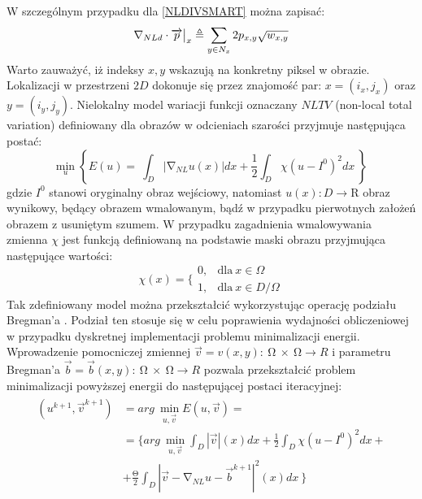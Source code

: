 \documentclass[12pt, twoside, openany]{report}
\theoremstyle{definition}
\begin{document}
W szczególnym przypadku dla \eqref{NLDIVSMART} można zapisać:
\begin{equation}
{\mathrm{\nabla }}_{NLd}\cdot \overrightarrow{p}\big|_x \triangleq \sum_{ 
y\in N_x \\ 
}{2p_{x,y}}\sqrt{w_{x,y}}
\label{DNLDIVSMART}
\end{equation}
Warto zauważyć, iż indeksy $x,y$ wskazują na konkretny piksel w obrazie. Lokalizacji w przestrzeni $2D$ dokonuje się przez znajomość par: $x=(i_x,j_x)$ oraz $y=(i_y,j_y)$.
Nielokalny model wariacji funkcji oznaczany $NLTV$ (non-local total variation) definiowany dla obrazów w odcieniach szarości przyjmuje następująca postać:
\begin{equation}
{\mathop{\mathrm{min}}_{u} \left\{E\left(u\right)=\ \int_D{\left|{\mathrm{\nabla }}_{NL}u(x)\right|}dx+\frac{1}{2}\int_D{\chi{\left(u-I^0\right)}^2}dx\ \right\}\ }
\label{NLTVGRAY}
\end{equation}
gdzie $I^0$ stanowi oryginalny obraz wejściowy, natomiast $u\left(x\right):D\mathrm{\longrightarrow }\mathrm{R}$ obraz wynikowy, będący obrazem wmalowanym, bądź w przypadku pierwotnych założeń obrazem z usuniętym szumem. W przypadku zagadnienia wmalowywania zmienna ${\chi }$ jest funkcją definiowaną na podstawie maski obrazu przyjmująca następujące wartości:
\begin{equation}
\chi \left(x\right)=\Bigg\{ \begin{array}{ll}
0, & \text{dla} \ x \in \Omega \\ 
1, & \text{dla} \ x \in D/ \Omega \end{array}
\label{maskFunction}
\end{equation}
Tak zdefiniowany model można przekształcić wykorzystując operację podziału Bregman’a \cite{bresson2009short}. Podział ten stosuje się w celu poprawienia wydajności obliczeniowej w przypadku dyskretnej implementacji problemu minimalizacji energii. Wprowadzenie pomocniczej zmiennej $\overrightarrow{v}=v\left(x,y\right):\ \mathrm{\Omega }\mathrm{\ } \times \ \mathrm{\Omega }\longrightarrow R$ i parametru Bregman’a $\overrightarrow{b}=\overrightarrow{b}\left(x,y\right):\ \mathrm{\Omega }\mathrm{\ }\times \ \mathrm{\Omega }\longrightarrow R$ pozwala przekształcić problem minimalizacji powyższej energii do następującej postaci iteracyjnej:
\begin{align}
\begin{aligned}
\left(u^{k+1},{\overrightarrow{v}}^{k+1}\right) &= arg\ \mathop{\mathrm{min}}_{u,\overrightarrow{v}} E\left(u,\overrightarrow{v}\right)=\\ 
&= \biggl\{arg\ \mathop{\mathrm{min}}_{u,\overrightarrow{v}}
\int_D{|\overrightarrow{v}|\left(x\right)}dx+\frac{1}{2}\int_D{{\chi }{\left(u-I^0\right)}^2}dx+\\
&+  \frac{\mathrm{\Theta }}{2}\int_D{{\left|\overrightarrow{v}-{\mathrm{\nabla }}_{NL}u-{\overrightarrow{b}}^{k+1}\right|}^2(x)}dx\ \biggr\}
\end{aligned}
\label{NLTVGRAYMINPROB}
\end{align}
\end{document}
